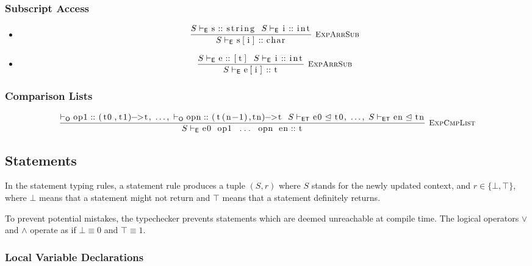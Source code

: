 \documentclass{article}
\newcommand{\code}[1]{\lstinline[columns=fixed]{#1}}
\newcommand{\drmrule}[5]{\frac{#1}{#2\vdash_{\mathsf{#3}}#4}\textsc{\ \small{#5}}}
\newcommand{\ruleapp}[1]{\vdash_{\mathsf{#1}}}
\newcommand{\mc}[1]{\textnormal{\code{#1}}}
\begin{document}
			\subsubsection{Subscript Access}
			
				\begin{itemize}
					\item
						\begin{align*}
							\drmrule{S\ruleapp{E}\mc{s}::\mc{string}\ \ S\ruleapp{E}\mc{i}::\mc{int}}{S}{E}{\mc{s[i]} :: \mc{char}}{ExpArrSub}
						\end{align*}
					\item
						\begin{align*}
							\drmrule{S\ruleapp{E}\mc{e}::\mc{[t]}\ \ S\ruleapp{E}\mc{i}::\mc{int}}{S}{E}{\mc{e[i]} :: \mc{t}}{ExpArrSub}
						\end{align*}
				\end{itemize}
			
			\subsubsection{Comparison Lists}
			
				\begin{align*}
					\drmrule{\ruleapp{O}\mc{op1}::\mc{(t0,t1)->t},\ \dots,\ \ruleapp{O}\mc{opn}::\mc{(t(n-1),tn)->t}\ \ S\ruleapp{ET}\mc{e0}\trianglelefteq\mc{t0},\ \dots,\ S\ruleapp{ET}\mc{en}\trianglelefteq\mc{tn}}{S}{E}{\mc{e0 op1 ... opn en} :: \mc{t}}{ExpCmpList}
				\end{align*}
				
		\subsection{Statements}
		
			In the statement typing rules, a statement rule produces a tuple $(S,r)$ where $S$ stands for the newly updated context, and $r\in\{\bot,\top\}$, where $\bot$ means that a statement might not return and $\top$ means that a statement definitely returns.
			
			To prevent potential mistakes, the typechecker prevents statements which are deemed unreachable at compile time. The logical operators $\vee$ and $\wedge$ operate as if $\bot\equiv0$ and $\top\equiv1$.
		
			\subsubsection{Local Variable Declarations}
			
\end{document}

